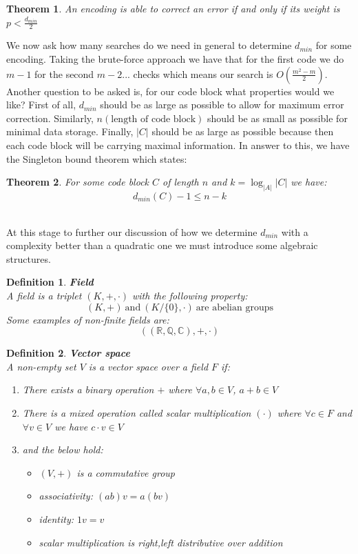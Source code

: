 \documentclass[titlepage]{article}
\newtheorem{theorem}{Theorem}[section]
\newtheorem{definition}{Definition}
\begin{document}
\begin{theorem}
An encoding is able to correct an error if and only if its weight is $p < \frac{d_{min}}{2}$
\end{theorem}

We now ask how many searches do we need in general to determine $d_{min}$ for some encoding. Taking the brute-force approach we have that for the first code we do $m-1$ for the second $m-2$... checks which means our search is $O(\frac{m^{2}-m}{2})$. 
\\

Another question to be asked is, for our code block what properties would we like? First of all, $d_{min}$ should be as large as possible to allow for maximum error correction. Similarly, $n(\text{length of code block})$ should be as small as possible for minimal data storage. Finally, $|C|$ should be as large as possible because then each code block will be carrying maximal information. In answer to this, we have the Singleton bound theorem which states:

\begin{theorem}
For some code block $C$ of length $n$ and $k = \log_{|A|}{|C|}$ we have:
$$d_{min}(C) - 1 \leq n- k$$
\end{theorem}
\\

At this stage to further our discussion of how we determine $d_{min}$ with a complexity better than a quadratic one we must introduce some algebraic structures. 

\begin{definition} \textbf{Field}
\\
A field is a triplet $(K, + , \cdot)$ with the following property:
$$ (K, +) \ \text{and} \ (K/\{0\}, \cdot) \ \text{are abelian groups}$$
Some examples of non-finite fields are:
$$((\mathbb{R}, \mathbb{Q}, \mathbb{C}), +, \cdot)$$
\end{definition}

\begin{definition} \textbf{Vector space}
\\
A non-empty set $V$ is a vector space over a field $F$ if:
\begin{enumerate}
    \item There exists a binary operation $+$ where $\forall a,b \in V$, $a+b \in V$
    \item There is a mixed operation called scalar multiplication $(\cdot)$ where $\forall c \in F$ and $\forall v \in V$ we have $c\cdot v \in V$
    \item and the below hold:
    \begin{itemize}
        \item $(V,+)$ is a commutative group 
        \item associativity: $(ab)v = a(bv)$
        \item identity: $1v = v$
        \item scalar multiplication is right,left distributive over addition 
    \end{itemize}
\end{enumerate}
\end{definition}
\end{document}
